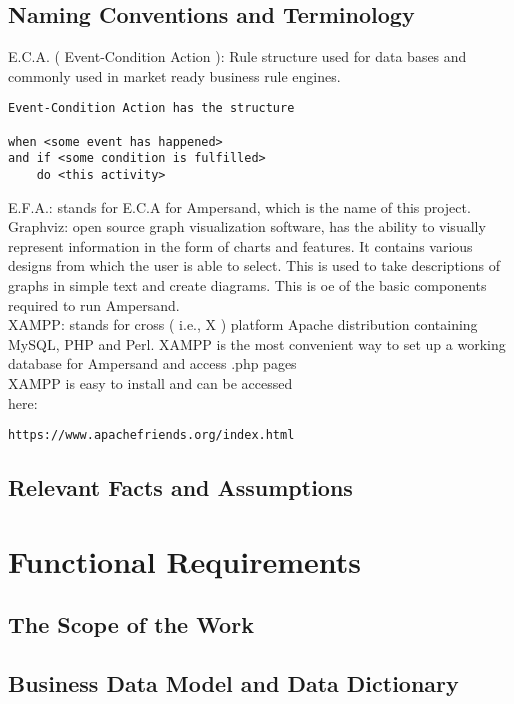 \documentclass[12pt]{report}
\begin{document}
\section{Naming Conventions and Terminology}\label{sec:Naming} 
E.C.A. \big( Event-Condition Action \big): Rule structure used for data bases 
and commonly used in market ready business rule engines. %
\begin{verbatim}
Event-Condition Action has the structure

when <some event has happened> 
and if <some condition is fulfilled> 
    do <this activity>

\end{verbatim} %
E.F.A.: stands for E.C.A for Ampersand, which is the name of this project. \\
Graphviz: open source graph visualization software, has the ability to visually 
represent information in the form of charts and features. It contains various 
designs from which the user is able to select. This is used to take 
descriptions of graphs in simple text and create diagrams. This is oe of the 
basic components required to run Ampersand.\\
XAMPP: stands for cross \big( i.e., X \big) platform Apache distribution 
containing MySQL, PHP and Perl. XAMPP is the most convenient way to set up a 
working database for Ampersand and access .php pages\\ XAMPP is easy to install 
and can be accessed \\
here: 
\begin{verbatim}
https://www.apachefriends.org/index.html
\end{verbatim} 
\section{Relevant Facts and Assumptions}\label{sec:Assumptions}

\chapter{Functional Requirements}\label{ch:Functional}
\section{The Scope of the Work}\label{sec:ScopeOfWork}
\section{Business Data Model and Data Dictionary}\label{sec:DataModel}
\end{document}
